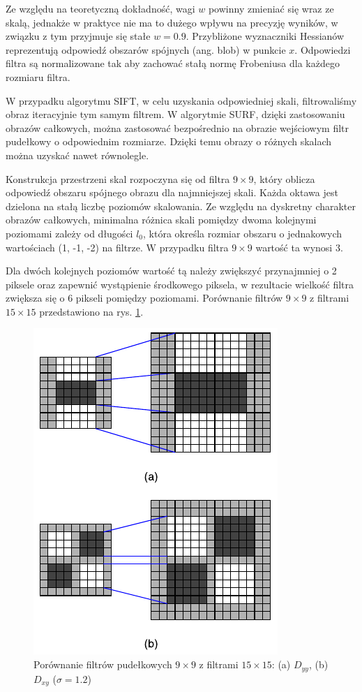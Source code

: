 Ze względu na teoretyczną dokładność, wagi $w$ powinny zmieniać się wraz ze skalą, jednakże w praktyce nie ma to dużego wpływu na precyzję wyników, w związku z tym przyjmuje się stałe $w = 0.9$. Przybliżone wyznaczniki Hessianów reprezentują odpowiedź obszarów spójnych ({ang. blob}) w punkcie $x$. Odpowiedzi filtra są normalizowane tak aby zachować stałą normę Frobeniusa dla każdego rozmiaru filtra.

W przypadku algorytmu SIFT, w celu uzyskania odpowiedniej skali, filtrowaliśmy obraz iteracyjnie tym samym filtrem. W algorytmie SURF, dzięki zastosowaniu obrazów całkowych, można zastosować bezpośrednio na obrazie wejściowym filtr pudełkowy o odpowiednim rozmiarze. Dzięki temu obrazy o różnych skalach można uzyskać nawet równolegle. 

Konstrukcja przestrzeni skal rozpoczyna się od filtra $9 \times 9$, który oblicza odpowiedź obszaru spójnego obrazu dla najmniejszej skali. Każda oktawa jest dzielona na stałą liczbę poziomów skalowania. Ze względu na dyskretny charakter obrazów całkowych, minimalna różnica skali pomiędzy dwoma kolejnymi poziomami zależy od długości $l_0$, która określa rozmiar obszaru o jednakowych wartościach (1, -1, -2) na filtrze. W przypadku filtra $9 \times 9$ wartość ta wynosi 3.

Dla dwóch kolejnych poziomów wartość tą należy zwiększyć przynajmniej o 2 piksele oraz zapewnić wystąpienie środkowego piksela, w rezultacie wielkość filtra zwiększa się o 6 pikseli pomiędzy poziomami. Porównanie filtrów $9 \times 9$ z filtrami $15 \times 15$ przedstawiono na rys. \ref{fig:surf-9-to-15}.

\begin{figure}[h]
	\centering
	\includegraphics[scale=1.5]{graphics/01_podstawy_teoretyczne/surf-9-to-15.pdf}
	\caption{Porównanie filtrów pudełkowych $9 \times 9$ z filtrami $15 \times 15$: (a) $D_{yy}$, (b) $D_{xy}$ ($\sigma = 1.2$) \cite{BAY08}}
	\label{fig:surf-9-to-15}
\end{figure}

